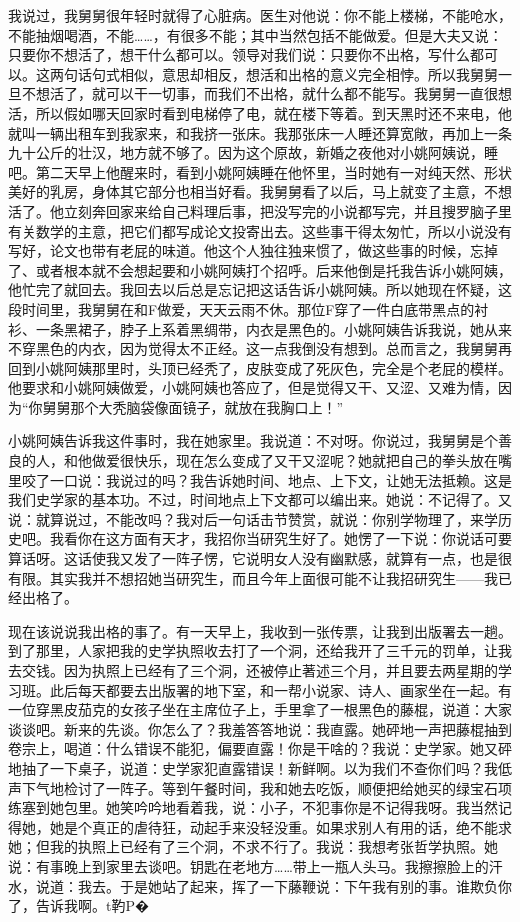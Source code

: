 我说过，我舅舅很年轻时就得了心脏病。医生对他说：你不能上楼梯，不能呛水，不能抽烟喝酒，不能……，有很多不能；其中当然包括不能做爱。但是大夫又说：只要你不想活了，想干什么都可以。领导对我们说：只要你不出格，写什么都可以。这两句话句式相似，意思却相反，想活和出格的意义完全相悖。所以我舅舅一旦不想活了，就可以干一切事，而我们不出格，就什么都不能写。我舅舅一直很想活，所以假如哪天回家时看到电梯停了电，就在楼下等着。到天黑时还不来电，他就叫一辆出租车到我家来，和我挤一张床。我那张床一人睡还算宽敞，再加上一条九十公斤的壮汉，地方就不够了。因为这个原故，新婚之夜他对小姚阿姨说，睡吧。第二天早上他醒来时，看到小姚阿姨睡在他怀里，当时她有一对纯天然、形状美好的乳房，身体其它部分也相当好看。我舅舅看了以后，马上就变了主意，不想活了。他立刻奔回家来给自己料理后事，把没写完的小说都写完，并且搜罗脑子里有关数学的主意，把它们都写成论文投寄出去。这些事干得太匆忙，所以小说没有写好，论文也带有老屁的味道。他这个人独往独来惯了，做这些事的时候，忘掉了、或者根本就不会想起要和小姚阿姨打个招呼。后来他倒是托我告诉小姚阿姨，他忙完了就回去。我回去以后总是忘记把这话告诉小姚阿姨。所以她现在怀疑，这段时间里，我舅舅在和F做爱，天天云雨不休。那位F穿了一件白底带黑点的衬衫、一条黑裙子，脖子上系着黑绸带，内衣是黑色的。小姚阿姨告诉我说，她从来不穿黑色的内衣，因为觉得太不正经。这一点我倒没有想到。总而言之，我舅舅再回到小姚阿姨那里时，头顶已经秃了，皮肤变成了死灰色，完全是个老屁的模样。他要求和小姚阿姨做爱，小姚阿姨也答应了，但是觉得又干、又涩、又难为情，因为“你舅舅那个大秃脑袋像面镜子，就放在我胸口上！” 

小姚阿姨告诉我这件事时，我在她家里。我说道：不对呀。你说过，我舅舅是个善良的人，和他做爱很快乐，现在怎么变成了又干又涩呢？她就把自己的拳头放在嘴里咬了一口说：我说过的吗？我告诉她时间、地点、上下文，让她无法抵赖。这是我们史学家的基本功。不过，时间地点上下文都可以编出来。她说：不记得了。又说：就算说过，不能改吗？我对后一句话击节赞赏，就说：你别学物理了，来学历史吧。我看你在这方面有天才，我招你当研究生好了。她愣了一下说：你说话可要算话呀。这话使我又发了一阵子愣，它说明女人没有幽默感，就算有一点，也是很有限。其实我并不想招她当研究生，而且今年上面很可能不让我招研究生——我已经出格了。 

现在该说说我出格的事了。有一天早上，我收到一张传票，让我到出版署去一趟。到了那里，人家把我的史学执照收去打了一个洞，还给我开了三千元的罚单，让我去交钱。因为执照上已经有了三个洞，还被停止著述三个月，并且要去两星期的学习班。此后每天都要去出版署的地下室，和一帮小说家、诗人、画家坐在一起。有一位穿黑皮茄克的女孩子坐在主席位子上，手里拿了一根黑色的藤棍，说道：大家谈谈吧。新来的先谈。你怎么了？我羞答答地说：我直露。她砰地一声把藤棍抽到卷宗上，喝道：什么错误不能犯，偏要直露！你是干啥的？我说：史学家。她又砰地抽了一下桌子，说道：史学家犯直露错误！新鲜啊。以为我们不查你们吗？我低声下气地检讨了一阵子。等到午餐时间，我和她去吃饭，顺便把给她买的绿宝石项练塞到她包里。她笑吟吟地看着我，说：小子，不犯事你是不记得我呀。我当然记得她，她是个真正的虐待狂，动起手来没轻没重。如果求别人有用的话，绝不能求她；但我的执照上已经有了三个洞，不求不行了。我说：我想考张哲学执照。她说：有事晚上到家里去谈吧。钥匙在老地方……带上一瓶人头马。我擦擦脸上的汗水，说道：我去。于是她站了起来，挥了一下藤鞭说：下午我有别的事。谁欺负你了，告诉我啊。t靮P� 

